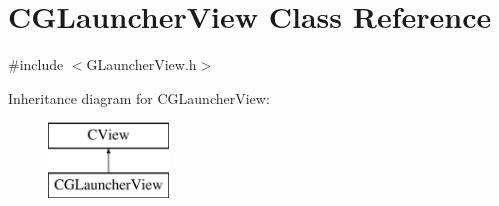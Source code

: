 \hypertarget{class_c_g_launcher_view}{}\section{C\+G\+Launcher\+View Class Reference}
\label{class_c_g_launcher_view}


{\ttfamily \#include $<$G\+Launcher\+View.\+h$>$}

Inheritance diagram for C\+G\+Launcher\+View\+:\begin{figure}[H]
\begin{center}
\leavevmode
\includegraphics[height=2.000000cm]{class_c_g_launcher_view}
\end{center}
\end{figure}
